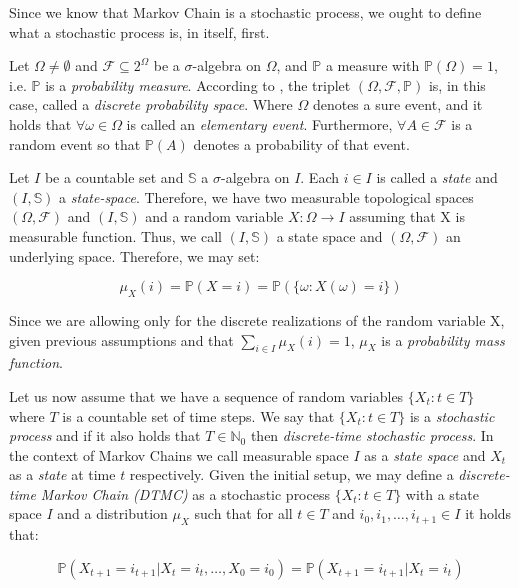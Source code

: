 Since we know that Markov Chain is a stochastic process, we ought to define what a stochastic process is, in itself, first. 

Let $\Omega \neq \emptyset$ and $\mathcal{F} \subseteq 2^{\Omega}$ be a $\sigma$-algebra on $\Omega$, and $\mathbb{P}$ a measure with $\mathbb{P}(\Omega) = 1$, i.e. $\mathbb{P}$ is a \textit{probability measure}. According to \citep{Dostal}, the triplet $(\Omega, \mathcal{F}, \mathbb{P})$ is, in this case, called a \textit{discrete probability space}. Where $\Omega$ denotes a sure event, and it holds that $\forall \omega \in \Omega$ is called an \textit{elementary event}. Furthermore, $\forall A \in \mathcal{F}$ is a random event  so that $\mathbb{P}(A)$ denotes a probability of that event. 

Let $I$ be a countable set and $\mathbb{S}$ a $\sigma$-algebra on $I$. Each $i \in I$ is called a \textit{state} and $(I,\mathbb{S})$ a \textit{state-space}.
Therefore, we have two measurable topological spaces $(\Omega,\mathcal{F})$ and $(I,\mathbb{S})$ and a random variable $X: \Omega \rightarrow I$ assuming that X is measurable function. Thus, we call $(I,\mathbb{S})$ a state space and $(\Omega, \mathcal{F})$ an underlying space. Therefore, we may set:

\begin{equation}
\mu_X(i) = \mathbb{P}(X=i)=\mathbb{P}(\{\omega: X(\omega)=i\})
\end{equation}

Since we are allowing only for the discrete realizations of the random variable X, given previous assumptions and that $\sum\limits_{i \in I} \mu_X(i)=1$, $\mu_X$ is a \textit{probability mass function}.~\citep{Norris2012}

Let us now assume that we have a sequence of random variables $\{X_t : t \in T\}$ where $T$ is a countable set of time steps.
 We say that $\{X_t : t \in T\}$ is a \textit{stochastic process} and if it also holds that $T \in \mathbb{N}_0$ then \textit{discrete-time stochastic process}.
 In the context of Markov Chains we call measurable space $I$ as a \textit{state space} and $X_t$ as a \textit{state} at time $t$ respectively.
 Given the initial setup, we may define a \textit{discrete-time Markov Chain (DTMC)} as a stochastic process $\{X_t : t \in T\}$ with a state space $I$ and a distribution $\mu_X$ such that for all $t \in T$ and $i_0,i_1,\ldots,i_{t+1} \in I$ it holds that:

\begin{equation} \label{eq:DTMC}
\mathbb{P}(X_{t+1}=i_{t+1}|X_t=i_t,\ldots,X_0=i_0) = \mathbb{P}(X_{t+1}=i_{t+1}|X_t=i_t)
\end{equation}

